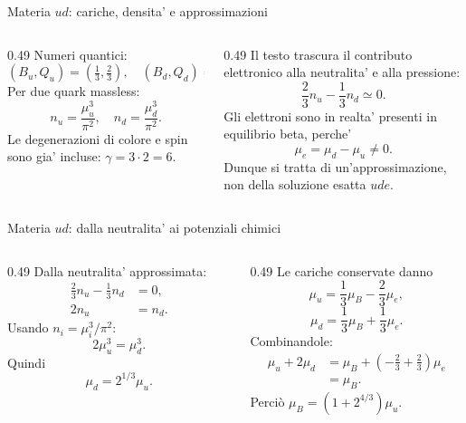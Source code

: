 \begin{frame}{Materia $ud$: cariche, densita' e approssimazioni}
\small
\begin{columns}[T,onlytextwidth]
\begin{column}{0.49\textwidth}
Numeri quantici:
\[
(B_u,Q_u)=\left(\tfrac13,\tfrac23\right),
\quad(B_d,Q_d)=\left(\tfrac13,-\tfrac13\right).
\]
Per due quark massless:
\[
n_u=\frac{\mu_u^3}{\pi^2},
\quad n_d=\frac{\mu_d^3}{\pi^2}.
\]
Le degenerazioni di colore e spin
sono gia' incluse: $\gamma=3\cdot2=6$.
\end{column}
\begin{column}{0.49\textwidth}
Il testo trascura il contributo elettronico
alla neutralita' e alla pressione:
\[
\frac23n_u-\frac13n_d\simeq0.
\]
Gli elettroni sono in realta' presenti
in equilibrio beta, perche'
\[
\mu_e=\mu_d-\mu_u\ne0.
\]
Dunque si tratta di un'approssimazione,
non della soluzione esatta $ude$.
\end{column}
\end{columns}
\end{frame}

\begin{frame}{Materia $ud$: dalla neutralita' ai potenziali chimici}
\small
\begin{columns}[T,onlytextwidth]
\begin{column}{0.49\textwidth}
Dalla neutralita' approssimata:
\begin{align*}
\frac23n_u-\frac13n_d&=0,\\
2n_u&=n_d.
\end{align*}
Usando $n_i=\mu_i^3/\pi^2$:
\[
2\mu_u^3=\mu_d^3.
\]
Quindi
\[
\mu_d=2^{1/3}\mu_u.
\]
\end{column}
\begin{column}{0.49\textwidth}
Le cariche conservate danno
\[
\mu_u=\frac13\mu_B-\frac23\mu_e,
\]
\[
\mu_d=\frac13\mu_B+\frac13\mu_e.
\]
Combinandole:
\begin{align*}
\mu_u+2\mu_d
&=\mu_B
+\left(-\tfrac23+\tfrac23\right)\mu_e\\
&=\mu_B.
\end{align*}
Perciò $\mu_B=(1+2^{4/3})\mu_u$.
\end{column}
\end{columns}
\end{frame}

